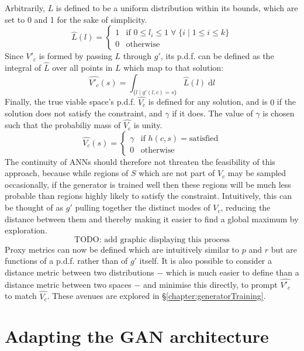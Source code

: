\documentclass[../../main.tex]{subfiles}
\begin{document}
Arbitrarily, $L$ is defined to be a uniform distribution within its bounds, which are set to 0 and 1 for the sake of simplicity.
\begin{equation}
	\hat{L}(l)=\left\{\begin{array}{ll}1&\mbox{if }0\le l_i\le1\;\forall\;\{i\;|\;1\le i\le k\}\\0&\mbox{otherwise}\end{array}\right.
\end{equation}
Since $V'_c$ is formed by passing $L$ through $g'$, its p.d.f. can be defined as the integral of $\hat{L}$ over all points in $L$ which map to that solution:
\begin{equation}
	\hat{V'_c}(s)=\int_{\{l\;|\;g'(l,c)=s\}}\hat{L}(l)\;\mathrm{d}l
\end{equation}
Finally, the true viable space's p.d.f. $\hat{V_c}$ is defined for any solution, and is $0$ if the solution does not satisfy the constraint, and $\gamma$ if it does.
The value of $\gamma$ is chosen such that the probabiliy mass of $\hat{V_c}$ is unity.
\begin{equation}
	\hat{V_c}(s)=\left\{\begin{array}{ll}\gamma&\mbox{if }h(c,s)=\text{satisfied}\\0&\mbox{otherwise}\end{array}\right.
\end{equation}
The continuity of ANNs should therefore not threaten the feasibility of this approach, because while regions of $S$ which are not part of $V_c$ may be sampled occasionally, if the generator is trained well then these regions will be much less probable than regions highly likely to satisfy the constraint.
Intuitively, this can be thought of as $g'$ pulling together the distinct modes of $V_c$, reducing the distance between them and thereby making it easier to find a global maximum by exploration.
\begin{equation}
	\text{TODO: add graphic displaying this process}
\end{equation}
Proxy metrics can now be defined which are intuitively similar to $p$ and $r$ but are functions of a p.d.f. rather than of $g'$ itself.
It is also possible to consider a distance metric between two distributions $-$ which is much easier to define than a distance metric between two spaces $-$ and minimise this directly, to prompt $\hat{V'_c}$ to match $\hat{V_c}$.
These avenues are explored in \S\ref{chapter:generatorTraining}.

\section{Adapting the GAN architecture} \label{section:adaptingTheGANArchitecture}
\end{document}
